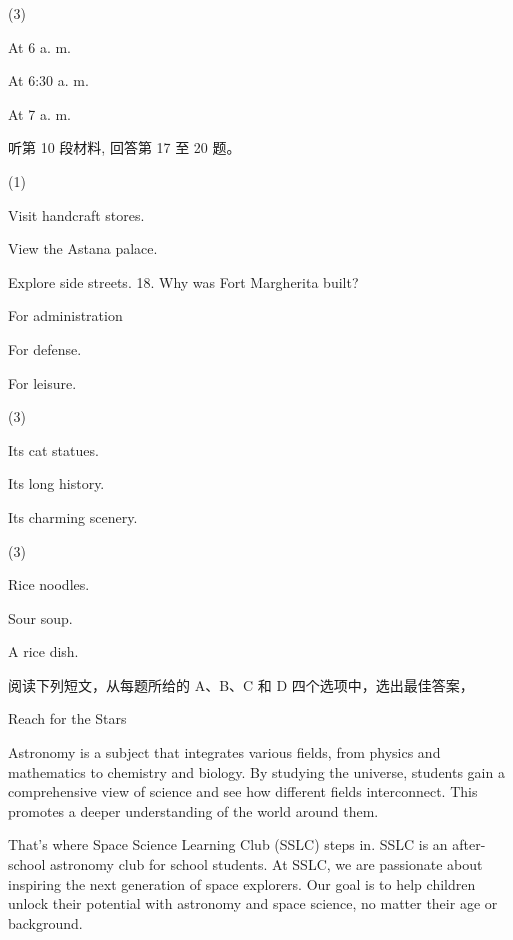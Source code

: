 \documentclass{英语试卷}
\begin{document}
\begin{choices}(3)
  \item At 6 a. m.
  \item At 6:30 a. m.
  \item At 7 a. m.
\end{choices}
\par 听第 10 段材料, 回答第 17 至 20 题。\par
{}
\begin{choices}(1)
  \item Visit handcraft stores.
  \item View the Astana palace.
  \item Explore side streets. 18. Why was Fort Margherita built?
  \item For administration
  \item For defense.
  \item For leisure.
\end{choices}
\begin{choices}(3)
  \item Its cat statues.
  \item Its long history.
  \item Its charming scenery.
\end{choices}
\begin{choices}(3)
  \item Rice noodles.
  \item Sour soup.
  \item A rice dish.
\end{choices}
\par 阅读下列短文，从每题所给的 A、B、C 和 D 四个选项中，选出最佳答案，\par
{}
\par Reach for the Stars\par
\par Astronomy is a subject that integrates various fields, from physics and mathematics to chemistry and biology. By studying the universe, students gain a comprehensive view of science and see how different fields interconnect. This promotes a deeper understanding of the world around them.\par
\par That's where Space Science Learning Club (SSLC) steps in. SSLC is an after-school astronomy club for school students. At SSLC, we are passionate about inspiring the next generation of space explorers. Our goal is to help children unlock their potential with astronomy and space science, no matter their age or background.\par
\end{document}
